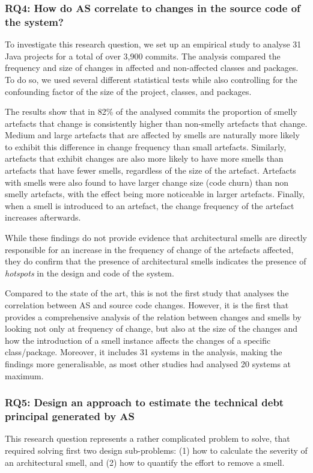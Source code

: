 \subsubsection*{RQ4: How do AS correlate to changes in the source code of the system?}
To investigate this research question, we set up an empirical study to analyse 31 Java projects for a total of over 3,900 commits.
The analysis compared the frequency and size of changes in affected and non-affected classes and packages.
To do so, we used several different statistical tests while also controlling for the confounding factor of the size of the project, classes, and packages.

The results show that in 82\% of the analysed commits the proportion of smelly artefacts that change is consistently higher than non-smelly artefacts that change.
Medium and large artefacts that are affected by smells are naturally more likely to exhibit this difference in change frequency than small artefacts.
Similarly, artefacts that exhibit changes are also more likely to have more smells than artefacts that have fewer smells, regardless of the size of the artefact.
Artefacts with smells were also found to have larger change size (code churn) than non smelly artefacts, with the effect being more noticeable in larger artefacts.
Finally, when a smell is introduced to an artefact, the change frequency of the artefact increases afterwards.

While these findings do not provide evidence that architectural smells are directly responsible for an increase in the frequency of change of the artefacts affected, they do confirm that the presence of architectural smells indicates the presence of \emph{hotspots} in the design and code of the system.

Compared to the state of the art, this is not the first study that analyses the correlation between AS and source code changes. However, it is the first that provides a comprehensive analysis of the relation between changes and smells by looking not only at frequency of change, but also at the size of the changes and how the introduction of a smell instance affects the changes of a specific class/package.
Moreover, it includes 31 systems in the analysis, making the findings more generalisable, as most other studies had analysed 20 systems at maximum.

\subsubsection*{RQ5: Design an approach to estimate the technical debt principal generated by AS}
This research question represents a rather complicated problem to solve, that required solving first two design sub-problems: (1) how to calculate the severity of an architectural smell, and (2) how to quantify the effort to remove a smell.

